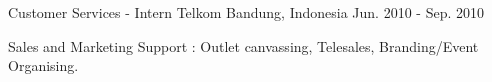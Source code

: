 \begin{cventries}
  \cventry
    {Customer Services - Intern} %
    {Telkom} %
    {Bandung, Indonesia} %
    {Jun. 2010 - Sep. 2010} %
    {
      \begin{cvitems} %
        \item {Sales and Marketing Support : Outlet canvassing, Telesales, Branding/Event Organising.}
      \end{cvitems}
    }

\end{cventries}
